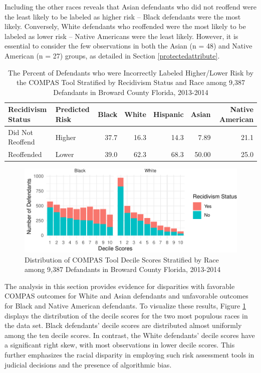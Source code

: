 \documentclass[12pt, twoside]{amherstthesis}
\begin{document}
Including the other races reveals that Asian defendants who did not reoffend were the least likely to be labeled as higher risk -- Black defendants were the most likely. Conversely, White defendants who reoffended were the most likely to be labeled as lower risk -- Native Americans were the least likely. However, it is essential to consider the few observations in both the Asian (n = 48) and Native American (n = 27) groups, as detailed in Section \ref{protectedattribute}.
\begin{table}

\caption{\label{tab:ch3table2}The Percent of Defendants who were Incorrectly Labeled Higher/Lower Risk by the COMPAS Tool Stratified by Recidivism Status and Race among 9,387 Defandants in Broward County Florida, 2013-2014}
\centering
\begin{tabular}[t]{llrrrrr}
\toprule
Recidivism Status & Predicted Risk & Black & White & Hispanic & Asian & Native American\\
\midrule
Did Not Reoffend & Higher & 37.7 & 16.3 & 14.3 & 7.89 & 21.1\\
Reoffended & Lower & 39.0 & 62.3 & 68.3 & 50.00 & 25.0\\
\bottomrule
\end{tabular}
\end{table}
\begin{figure}

{\centering \includegraphics{Dasha-Asienga_StatThesis_files/figure-latex/ch3fig11-1} 

}

\caption{Distribution of COMPAS Tool Decile Scores Stratified by Race among 9,387 Defandants in Broward County Florida, 2013-2014}\label{fig:ch3fig11}
\end{figure}
The analysis in this section provides evidence for disparities with favorable COMPAS outcomes for White and Asian defendants and unfavorable outcomes for Black and Native American defendants. To visualize these results, Figure \ref{fig:ch3fig11} displays the distribution of the decile scores for the two most populous races in the data set. Black defendants' decile scores are distributed almost uniformly among the ten decile scores. In contrast, the White defendants' decile scores have a significant right skew, with most observations in lower decile scores. This further emphasizes the racial disparity in employing such risk assessment tools in judicial decisions and the presence of algorithmic bias.
\end{document}

